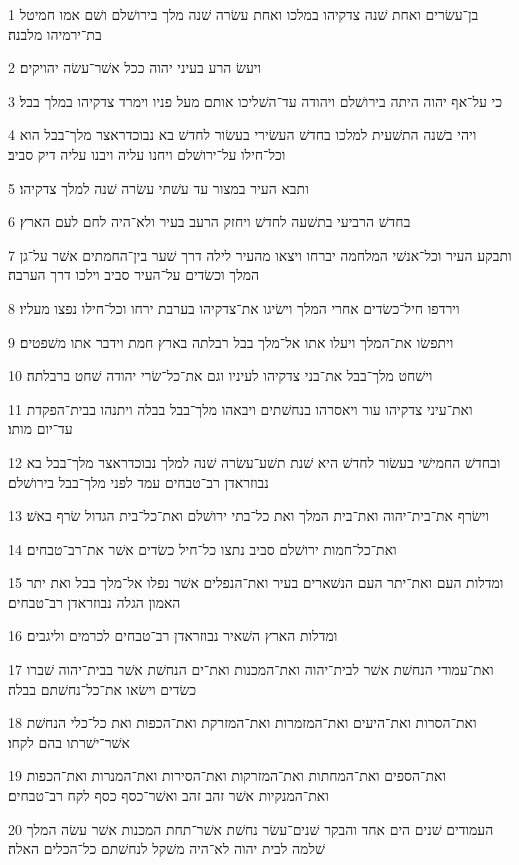 \par 1 בן־עשׂרים ואחת שׁנה צדקיהו במלכו ואחת עשׂרה שׁנה מלך בירושׁלם ושׁם אמו חמיטל בת־ירמיהו מלבנה׃
\par 2 ויעשׂ הרע בעיני יהוה ככל אשׁר־עשׂה יהויקים׃
\par 3 כי על־אף יהוה היתה בירושׁלם ויהודה עד־השׁליכו אותם מעל פניו וימרד צדקיהו במלך בבל׃
\par 4 ויהי בשׁנה התשׁעית למלכו בחדשׁ העשׂירי בעשׂור לחדשׁ בא נבוכדראצר מלך־בבל הוא וכל־חילו על־ירושׁלם ויחנו עליה ויבנו עליה דיק סביב׃
\par 5 ותבא העיר במצור עד עשׁתי עשׂרה שׁנה למלך צדקיהו׃
\par 6 בחדשׁ הרביעי בתשׁעה לחדשׁ ויחזק הרעב בעיר ולא־היה לחם לעם הארץ׃
\par 7 ותבקע העיר וכל־אנשׁי המלחמה יברחו ויצאו מהעיר לילה דרך שׁער בין־החמתים אשׁר על־גן המלך וכשׂדים על־העיר סביב וילכו דרך הערבה׃
\par 8 וירדפו חיל־כשׂדים אחרי המלך וישׂיגו את־צדקיהו בערבת ירחו וכל־חילו נפצו מעליו׃
\par 9 ויתפשׂו את־המלך ויעלו אתו אל־מלך בבל רבלתה בארץ חמת וידבר אתו משׁפטים׃
\par 10 וישׁחט מלך־בבל את־בני צדקיהו לעיניו וגם את־כל־שׂרי יהודה שׁחט ברבלתה׃
\par 11 ואת־עיני צדקיהו עור ויאסרהו בנחשׁתים ויבאהו מלך־בבל בבלה ויתנהו בבית־הפקדת עד־יום מותו׃
\par 12 ובחדשׁ החמישׁי בעשׂור לחדשׁ היא שׁנת תשׁע־עשׂרה שׁנה למלך נבוכדראצר מלך־בבל בא נבוזראדן רב־טבחים עמד לפני מלך־בבל בירושׁלם׃
\par 13 וישׂרף את־בית־יהוה ואת־בית המלך ואת כל־בתי ירושׁלם ואת־כל־בית הגדול שׂרף באשׁ׃
\par 14 ואת־כל־חמות ירושׁלם סביב נתצו כל־חיל כשׂדים אשׁר את־רב־טבחים׃
\par 15 ומדלות העם ואת־יתר העם הנשׁארים בעיר ואת־הנפלים אשׁר נפלו אל־מלך בבל ואת יתר האמון הגלה נבוזראדן רב־טבחים׃
\par 16 ומדלות הארץ השׁאיר נבוזראדן רב־טבחים לכרמים וליגבים׃
\par 17 ואת־עמודי הנחשׁת אשׁר לבית־יהוה ואת־המכנות ואת־ים הנחשׁת אשׁר בבית־יהוה שׁברו כשׂדים וישׂאו את־כל־נחשׁתם בבלה׃
\par 18 ואת־הסרות ואת־היעים ואת־המזמרות ואת־המזרקת ואת־הכפות ואת כל־כלי הנחשׁת אשׁר־ישׁרתו בהם לקחו׃
\par 19 ואת־הספים ואת־המחתות ואת־המזרקות ואת־הסירות ואת־המנרות ואת־הכפות ואת־המנקיות אשׁר זהב זהב ואשׁר־כסף כסף לקח רב־טבחים׃
\par 20 העמודים שׁנים הים אחד והבקר שׁנים־עשׂר נחשׁת אשׁר־תחת המכנות אשׁר עשׂה המלך שׁלמה לבית יהוה לא־היה משׁקל לנחשׁתם כל־הכלים האלה׃
